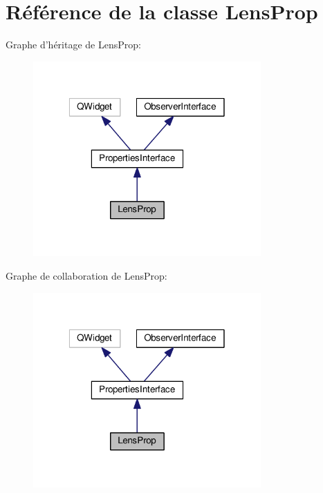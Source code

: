 \hypertarget{classLensProp}{\section{Référence de la classe Lens\+Prop}
\label{classLensProp}
}


Graphe d'héritage de Lens\+Prop\+:
\nopagebreak
\begin{figure}[H]
\begin{center}
\leavevmode
\includegraphics[width=247pt]{d8/d9c/classLensProp__inherit__graph}
\end{center}
\end{figure}


Graphe de collaboration de Lens\+Prop\+:
\nopagebreak
\begin{figure}[H]
\begin{center}
\leavevmode
\includegraphics[width=247pt]{de/d14/classLensProp__coll__graph}
\end{center}
\end{figure}
